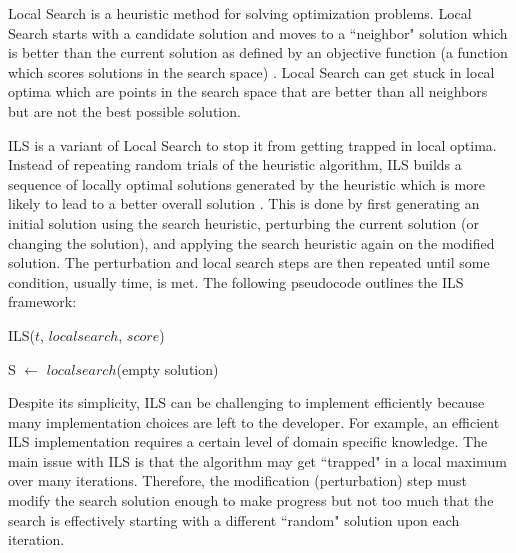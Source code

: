 \documentclass[11pt]{article}
\begin{document}
Local Search is a heuristic method for solving optimization problems. Local Search starts with a candidate solution and moves to a ``neighbor" solution which is better than the current solution as defined by an objective function (a function which scores solutions in the search space) \cite{gendreau2010handbook}. Local Search can get stuck in local optima which are points in the search space that are better than all neighbors but are not the best possible solution.

ILS is a variant of Local Search to stop it from getting trapped in local optima. Instead of repeating random trials of the heuristic algorithm, ILS builds a sequence of locally optimal solutions generated by the heuristic which is more likely to lead to a better overall solution \cite{gendreau2010handbook}. This is done by first generating an initial solution using the search heuristic, perturbing the current solution (or changing the solution), and applying the search heuristic again on the modified solution. The perturbation and local search steps are then repeated until some condition, usually time, is met.
The following pseudocode outlines the ILS framework:

%
%
\begin{algorithm}[!h]
\caption{ILS($t$, $localsearch$, $score$)}
S $\gets$ $localsearch$(empty solution)\;
\end{algorithm}

Despite its simplicity, ILS can be challenging to implement efficiently because many implementation choices are left to the developer. For example, an efficient ILS implementation requires a certain level of domain specific knowledge. The main issue with ILS is that the algorithm may get ``trapped" in a local maximum over many iterations. Therefore, the modification (perturbation) step must modify the search solution enough to make progress but not too much that the search is effectively starting with a different ``random" solution upon each iteration. 

\end{document}
